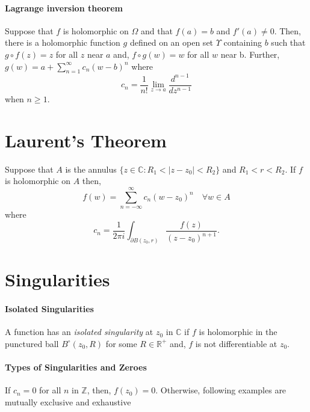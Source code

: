 \documentclass[12pt, letterpaper]{article}
\begin{document}
    \paragraph{Lagrange inversion theorem}
    Suppose that \(f\) is holomorphic on \(\Omega\) and that 
    \(f(a) = b\) and \(f'(a) \neq 0\).
    Then, there is a holomorphic function \(g\) defined on an open set
    \(\Upsilon\) containing \(b\) such that \(g\circ f(z) = z\) for all
    \(z\) near \(a\) and, \(f\circ g(w) = w\) for all \(w\) near b.
    Further, \(g(w) = a + \sum_{n=1}^{\infty} c_n (w-b)^n \) where
    \[c_n = \frac{1}{n!} \lim_{z\to a} \frac{d^{n-1}}{dz^{n-1}}\]
    when \(n\geq 1\).


    \section{Laurent's Theorem}
    Suppose that \(A\) is the annulus
    \(\{z\in \mathbb{C} : R_1 < |z-z_0| < R_2\}\) and
    \(R_1 < r < R_2\). If \(f\) is holomorphic on \(A\) then,
    \[ f(w) = \sum_{n=-\infty}^{\infty} c_n (w-z_0)^n
    \quad \forall w\in A\] where
    \[c_n = \frac{1}{2 \pi i} \int_{\partial B(z_0, r)}
    \frac{f(z)}{(z-z_0)^{n+1}}.\]


    \section{Singularities}

    \paragraph{Isolated Singularities}
    A function has an \textit{isolated singularity} at \(z_0\)
    in \(\mathbb{C}\) if \(f\) is holomorphic in the punctured ball 
    \(B^\circ (z_0, R)\) for some \(R\in \mathbb{R}^+\) and, \(f\) is 
    not differentiable at \(z_0\).

    \paragraph{Types of Singularities and Zeroes}
    If \(c_n = 0\) for all \(n\) in \( \mathbb{Z}\), then, \(f(z_0) = 0.\)
    Otherwise, following examples are mutually exclusive and exhaustive
\end{document}
